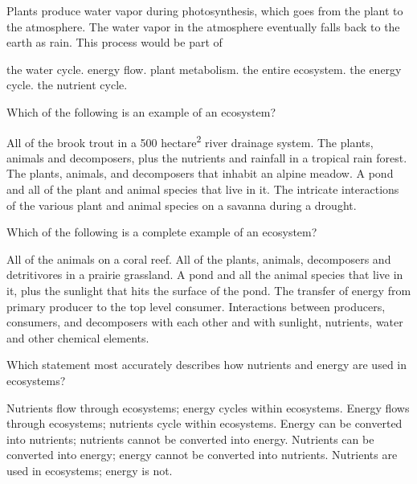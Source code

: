\question
Plants produce water vapor during photosynthesis, which goes from the plant to the atmosphere. The water vapor in the atmosphere eventually falls back to the earth as rain. This process would be part of

\begin{choices}
\correctchoice the water cycle.%
\choice energy flow.%
\choice plant metabolism.%
\choice the entire ecosystem.%
\choice the energy cycle.%
\choice the nutrient cycle.%
\end{choices}

\question
Which of the following is an example of an ecosystem?

\begin{choices}
\choice All of the brook trout in a 500 hectare\textsuperscript{2} river drainage system.%
\correctchoice The plants, animals and decomposers, plus the nutrients and rainfall in a tropical rain forest.%
\choice The plants, animals, and decomposers that inhabit an alpine meadow.%
\choice A pond and all of the plant and animal species that live in it.%
\choice The intricate interactions of the various plant and animal species on a savanna during a drought.%
\end{choices}


\question
Which of the following is a complete example of an ecosystem?  

\begin{choices}
\choice All of the animals on a coral reef. %
\choice All of the plants, animals, decomposers and detritivores in a prairie grassland. %
\choice A pond and all the animal species that live in it, plus the sunlight that hits the surface of the pond. %
\choice The transfer of energy from primary producer to the top level consumer. %
\correctchoice Interactions between producers, consumers, and decomposers with each other and with sunlight, nutrients, water and other chemical elements. %
\end{choices}


\question
Which statement most accurately describes how nutrients and energy are used in ecosystems?

\begin{choices}
\choice Nutrients flow through ecosystems; energy cycles within ecosystems. %
\correctchoice Energy flows through ecosystems; nutrients cycle within ecosystems. %
\choice Energy can be converted into nutrients; nutrients cannot be converted into energy. %
\choice Nutrients can be converted into energy; energy cannot be converted into nutrients. %
\choice Nutrients are used in ecosystems; energy is not. %
\end{choices}


